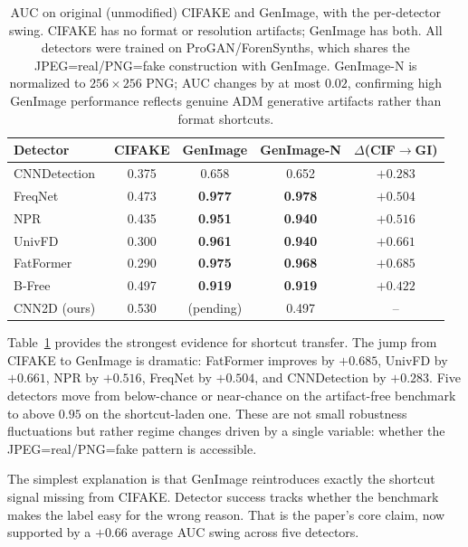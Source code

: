 \documentclass{article}
\begin{document}
\begin{table}[t]
\centering
\small
\begin{tabular}{lcccc}
\toprule
\textbf{Detector} & \textbf{CIFAKE} & \textbf{GenImage} & \textbf{GenImage-N} & \textbf{$\Delta$(CIF$\to$GI)} \\
\midrule
CNNDetection~\cite{wang2020cnn} & 0.375 & 0.658 & 0.652 & $+0.283$ \\
FreqNet~\cite{freqnet}          & 0.473 & \textbf{0.977} & \textbf{0.978} & $+0.504$ \\
NPR~\cite{npr}                  & 0.435 & \textbf{0.951} & \textbf{0.940} & $+0.516$ \\
UnivFD~\cite{univfd}            & 0.300 & \textbf{0.961} & \textbf{0.940} & $+0.661$ \\
FatFormer~\cite{fatformer}      & 0.290 & \textbf{0.975} & \textbf{0.968} & $+0.685$ \\
B-Free~\cite{bfree}             & 0.497 & \textbf{0.919} & \textbf{0.919} & $+0.422$ \\
CNN2D (ours)                    & 0.530 & (pending)       & 0.497           & --        \\
\bottomrule
\end{tabular}
\caption{AUC on original (unmodified) CIFAKE and GenImage, with the per-detector swing. CIFAKE has no format or resolution artifacts; GenImage has both. All detectors were trained on ProGAN/ForenSynths, which shares the JPEG=real/PNG=fake construction with GenImage. GenImage-N is normalized to $256\times256$ PNG; AUC changes by at most $0.02$, confirming high GenImage performance reflects genuine ADM generative artifacts rather than format shortcuts.}
\label{tab:genimage}
\end{table}

Table~\ref{tab:genimage} provides the strongest evidence for shortcut transfer.
The jump from CIFAKE to GenImage is dramatic: FatFormer improves by $+0.685$, UnivFD by $+0.661$, NPR by $+0.516$, FreqNet by $+0.504$, and CNNDetection by $+0.283$.
Five detectors move from below-chance or near-chance on the artifact-free benchmark to above $0.95$ on the shortcut-laden one.
These are not small robustness fluctuations but rather regime changes driven by a single variable: whether the JPEG=real/PNG=fake pattern is accessible.

The simplest explanation is that GenImage reintroduces exactly the shortcut signal missing from CIFAKE.
Detector success tracks whether the benchmark makes the label easy for the wrong reason.
That is the paper's core claim, now supported by a $+0.66$ average AUC swing across five detectors.
\end{document}
